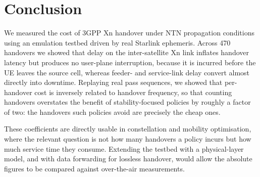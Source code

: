 \documentclass[conference]{IEEEtran}
\begin{document}
\section{Conclusion}

We measured the cost of 3GPP Xn handover under NTN propagation conditions using
an emulation testbed driven by real Starlink ephemeris. Across 470 handovers we
showed that delay on the inter-satellite Xn link inflates handover latency but
produces no user-plane interruption, because it is incurred before the UE
leaves the source cell, whereas feeder- and service-link delay convert almost
directly into downtime. Replaying real pass sequences, we showed that
per-handover cost is inversely related to handover frequency, so that counting
handovers overstates the benefit of stability-focused policies by roughly a
factor of two: the handovers such policies avoid are precisely the cheap ones.

These coefficients are directly usable in constellation and mobility
optimisation, where the relevant question is not how many handovers a policy
incurs but how much service time they consume. Extending the testbed with a
physical-layer model, and with data forwarding for lossless handover, would
allow the absolute figures to be compared against over-the-air measurements.
\end{document}
